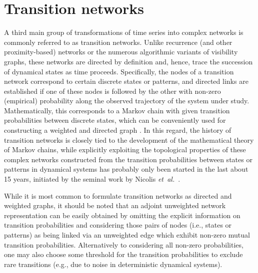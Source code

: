 \section{Transition networks} \label{sec:TransitionNt}

A third main group of transformations of time series into complex networks is commonly referred to as transition networks. Unlike recurrence (and other proximity-based) networks or the numerous algorithmic variants of visibility graphs, these networks are directed by definition and, hence, trace the succession of dynamical states as time proceeds. Specifically, the nodes of a transition network correspond to certain discrete states or patterns, and directed links are established if one of these nodes is followed by the other with non-zero (empirical) probability along the observed trajectory of the system under study. Mathematically, this corresponds to a Markov chain with given transition probabilities between discrete states, which can be conveniently used for constructing a weighted and directed graph \cite{Schnakenberg1976}. In this regard, the history of transition networks is closely tied to the development of the mathematical theory of Markov chains, while explicitly exploiting the topological properties of these complex networks constructed from the transition probabilities between states or patterns in dynamical systems has probably only been started in the last about 15 years, initiated by the seminal work by Nicolis \emph{et~al.}~\cite{Nicolis2005}. 

While it is most common to formulate transition networks as directed and weighted graphs, it should be noted that an adjoint unweighted network representation can be easily obtained by omitting the explicit information on transition probabilities and considering those pairs of nodes (i.e., states or patterns) as being linked via an unweighted edge which exhibit non-zero mutual transition probabilities. Alternatively to considering all non-zero probabilities, one may also choose some threshold for the transition probabilities to exclude rare transitions (e.g., due to noise in deterministic dynamical systems).

